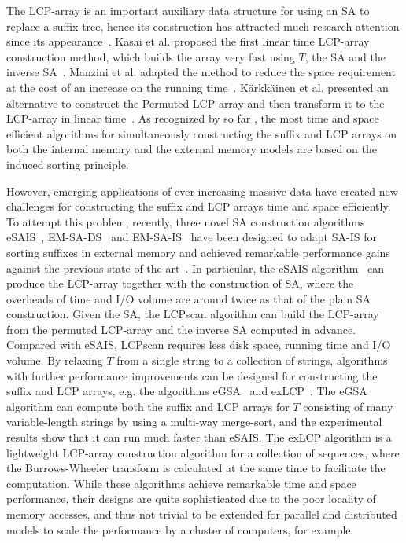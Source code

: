 \documentclass[10pt,journal,letterpaper,compsoc]{IEEEtran}
\begin{document}
\begin{CJK*}{GBK}{song}
{The LCP-array is an important auxiliary data structure for using an SA to replace a suffix tree, hence its construction has attracted much research attention since its appearance~\cite{Manber1993}. Kasai et al. proposed the first linear time LCP-array construction method, which builds the array very fast using $T$, the SA and the inverse SA~\cite{Kasai2001}. Manzini et al. adapted the method to reduce the space requirement at the cost of an increase on the running time~\cite{Manzini2004-2}. K\"{a}rkk\"{a}inen et al. presented an alternative to construct the Permuted LCP-array and then transform it to the LCP-array in linear time~\cite{Karkkainen2009}. As recognized by so far \cite{Fischer11,Bingmann12}, the most time and space efficient algorithms for simultaneously constructing the suffix and LCP arrays on both the internal memory and the external memory models are based on the induced sorting principle.
}

However, emerging applications of ever-increasing massive data have created new challenges for constructing the suffix and LCP arrays time and space efficiently. To attempt this problem, recently, three novel SA construction algorithms eSAIS~\cite{Bingmann12}, EM-SA-DS~\cite{Nong14} and EM-SA-IS~\cite{Nong15} have been designed to adapt SA-IS for sorting suffixes in external memory and achieved remarkable performance gains against the previous state-of-the-art~\cite{Dementiev08}. In particular, the eSAIS algorithm~\cite{Bingmann12} can produce the LCP-array together with the construction of SA, where the overheads of time and I/O volume are around twice as that of the plain SA construction. Given the SA, the LCPscan algorithm \cite{Juha2014} can build the LCP-array from the permuted LCP-array and the inverse SA computed in advance. Compared with eSAIS, LCPscan requires less disk space, running time and I/O volume.
By relaxing $T$ from a single string to a collection of strings, algorithms with further performance improvements can be designed for constructing the suffix and LCP arrays, e.g. the algorithms eGSA~\cite{Felipe2013} and exLCP~\cite{Markus2012}. The eGSA algorithm can compute both the suffix and LCP arrays for $T$ consisting of many variable-length strings by using a multi-way merge-sort, and the experimental results show that it can run much faster than eSAIS. The exLCP algorithm is a lightweight LCP-array construction algorithm for a collection of sequences, where the Burrows-Wheeler transform is calculated at the same time to facilitate the computation. While these algorithms achieve remarkable time and space performance, their designs are quite sophisticated due to the poor locality of memory accesses, and thus not trivial to be extended for parallel and distributed models to scale the performance by a cluster of computers, for example.



\end{CJK*}
\end{document}
